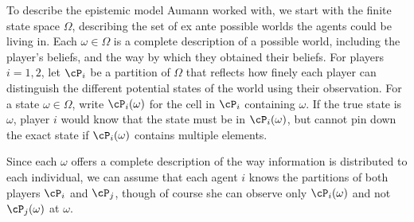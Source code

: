 To describe the epistemic model Aumann worked with, we start with the finite state space \(\Omega\), describing the set of ex ante possible worlds the agents could be living in.
Each  \(\omega \in \Omega\) is a complete description of a possible world, including the player's beliefs, and the way by which they obtained their beliefs.
For players \(i = 1, 2\), let \(\cP_i\) be a partition of \(\Omega\) that reflects how finely each player can distinguish the different potential states of the world using their observation.
For a state \(\omega \in \Omega\), write \(\cP_i(\omega)\) for the cell in \(\cP_i\) containing \(\omega\).
If the true state is \(\omega\), player \(i\) would know that the state must be in \(\cP_i(\omega)\), but cannot pin down the exact state if \(\cP_i(\omega)\) contains multiple elements.



Since each \(\omega\) offers a complete description of the way information is distributed to each individual, we can assume that each agent \(i\) knows the partitions of both players \(\cP_i\) and \(\cP_j\), though of course she can observe only \(\cP_i(\omega)\) and not \(\cP_j(\omega)\) at \(\omega\).

